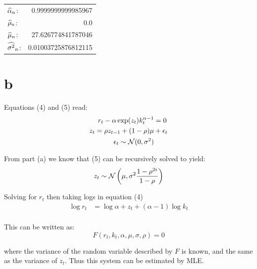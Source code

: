 \documentclass[12pt, letterpaper]{paper}
\begin{document}
\begin{center}
\begin{tabular}{lr}
\(\widehat{ \alpha }_{n}\): & 0.9999999999985967\\
\(\widehat{ \rho }_{n}\): & 0.0\\
\(\widehat{ \mu }_{n}\): & 27.626774841787046\\
\(\widehat{ \sigma^{2} }_{n}\): & 0.01003725876812115\\
\end{tabular}
\end{center}

\section{b}
\label{sec:org8c33180}

Equations (4) and (5) read:
\begin{align*}
  r_t - \alpha \exp( z_t ) k_t^{\alpha -1 } &= 0\\
  z_t = \rho z_{t-1} + (1-\rho)\mu &+ \epsilon_t\\
  \epsilon_t \sim \mathcal{N}( 0, \sigma^2)
\end{align*}

From part (a) we know that (5) can be recursively solved to yield:
\begin{equation*}
  z_t \sim \mathcal{N}\left( \mu, \sigma^2 \frac{1 - \rho^{2i}}{1-\rho}\right)
\end{equation*}

Solving for $r_t$ then taking logs in equation (4)
\begin{align*}
  \log r_t &= \log \alpha + z_t + (\alpha - 1 ) \log k_t\\
\end{align*}

This can be written as:
\begin{equation*}
  F( r_t, k_t, \alpha, \mu, \sigma, \rho ) = 0
\end{equation*}

where the variance of the random variable described by $F$ is known,
and the same as the variance of $z_t$. Thus this system can be
estimated by MLE.
\end{document}
